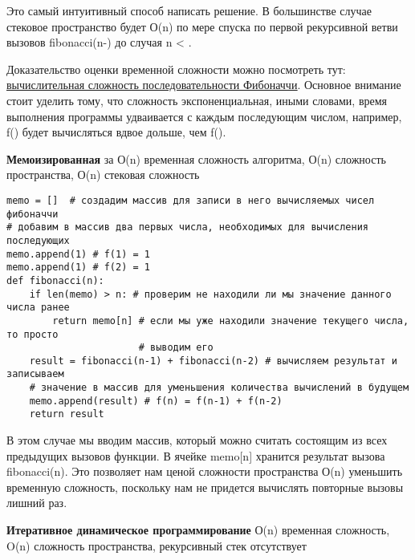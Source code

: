 \vspace{\baselineskip}
Это самый интуитивный способ написать решение. В большинстве случае стековое пространство будет О(n) по мере спуска по первой рекурсивной ветви вызовов fibonacci(n-) до случая n < .

\vspace{\baselineskip}
Доказательство оценки временной сложности можно посмотреть тут: \newline\href{https://stackoverflow.com/questions/360748/computational-complexity-of-fibonacci-sequence}{\underline{вычислительная сложность последовательности Фибоначчи}}. Основное внимание стоит уделить тому, что сложность экспоненциальная, иными словами, время выполнения программы удваивается с каждым последующим числом, например, f() будет вычисляться вдвое дольше, чем f(). 

\vspace{\baselineskip}
\textbf{Мемоизированная} за О(n) временная сложность алгоритма, О(n) сложность пространства, О(n) стековая сложность

\vspace{\baselineskip}
\begin{tcolorbox}
\begin{verbatim}
memo = []  # создадим массив для записи в него вычисляемых чисел фибоначчи
# добавим в массив два первых числа, необходимых для вычисления последующих
memo.append(1) # f(1) = 1
memo.append(1) # f(2) = 1
def fibonacci(n):
    if len(memo) > n: # проверим не находили ли мы значение данного числа ранее
        return memo[n] # если мы уже находили значение текущего числа, то просто 
                       # выводим его
    result = fibonacci(n-1) + fibonacci(n-2) # вычисляем результат и записываем 
    # значение в массив для уменьшения количества вычислений в будущем
    memo.append(result) # f(n) = f(n-1) + f(n-2)
    return result
\end{verbatim}
\end{tcolorbox}

\vspace{\baselineskip}
В этом случае мы вводим массив, который можно считать состоящим из всех предыдущих вызовов функции. В ячейке memo[n] хранится результат вызова fibonacci(n). Это позволяет нам ценой сложности пространства О(n) уменьшить временную сложность, поскольку нам не придется вычислять повторные вызовы лишний раз.

\vspace{\baselineskip}
\textbf{Итеративное динамическое программирование} О(n) временная сложность, O(n) сложность пространства, рекурсивный стек отсутствует

